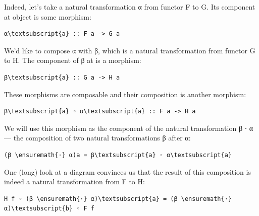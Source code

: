 Indeed, let's take a natural transformation α from functor F to G. Its
component at object  is some morphism:

\begin{Verbatim}[commandchars=\\\{\}]
α\textsubscript{a} :: F a -> G a
\end{Verbatim}
We'd like to compose α with β, which is a natural transformation from
functor G to H. The component of β at  is a morphism:

\begin{Verbatim}[commandchars=\\\{\}]
β\textsubscript{a} :: G a -> H a
\end{Verbatim}
These morphisms are composable and their composition is another
morphism:

\begin{Verbatim}[commandchars=\\\{\}]
β\textsubscript{a} ◦ α\textsubscript{a} :: F a -> H a
\end{Verbatim}
We will use this morphism as the component of the natural transformation
β ⋅ α --- the composition of two natural transformations β after α:

\begin{Verbatim}[commandchars=\\\{\}]
(β \ensuremath{⋅} α)a = β\textsubscript{a} ◦ α\textsubscript{a}
\end{Verbatim}

\begin{figure}[H]
\centering
{}
\end{figure}

\noindent
One (long) look at a diagram convinces us that the result of this
composition is indeed a natural transformation from F to H:

\begin{Verbatim}[commandchars=\\\{\}]
H f ◦ (β \ensuremath{⋅} α)\textsubscript{a} = (β \ensuremath{⋅} α)\textsubscript{b} ◦ F f
\end{Verbatim}

